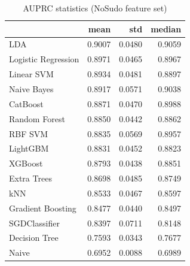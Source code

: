 \begin{table}
\caption{AUPRC statistics (NoSudo feature set)}
\label{tab:auprc_NoSudo_stats}
\begin{tabular}{lrrr}
\toprule
 & mean & std & median \\
\midrule
LDA & 0.9007 & 0.0480 & 0.9059 \\
Logistic Regression & 0.8971 & 0.0465 & 0.8967 \\
Linear SVM & 0.8934 & 0.0481 & 0.8897 \\
Naive Bayes & 0.8917 & 0.0571 & 0.9038 \\
CatBoost & 0.8871 & 0.0470 & 0.8988 \\
Random Forest & 0.8850 & 0.0442 & 0.8862 \\
RBF SVM & 0.8835 & 0.0569 & 0.8957 \\
LightGBM & 0.8831 & 0.0452 & 0.8823 \\
XGBoost & 0.8793 & 0.0438 & 0.8851 \\
Extra Trees & 0.8698 & 0.0485 & 0.8749 \\
kNN & 0.8533 & 0.0467 & 0.8597 \\
Gradient Boosting & 0.8477 & 0.0440 & 0.8497 \\
SGDClassifier & 0.8397 & 0.0711 & 0.8148 \\
Decision Tree & 0.7593 & 0.0343 & 0.7677 \\
Naive & 0.6952 & 0.0088 & 0.6989 \\
\bottomrule
\end{tabular}
\end{table}
